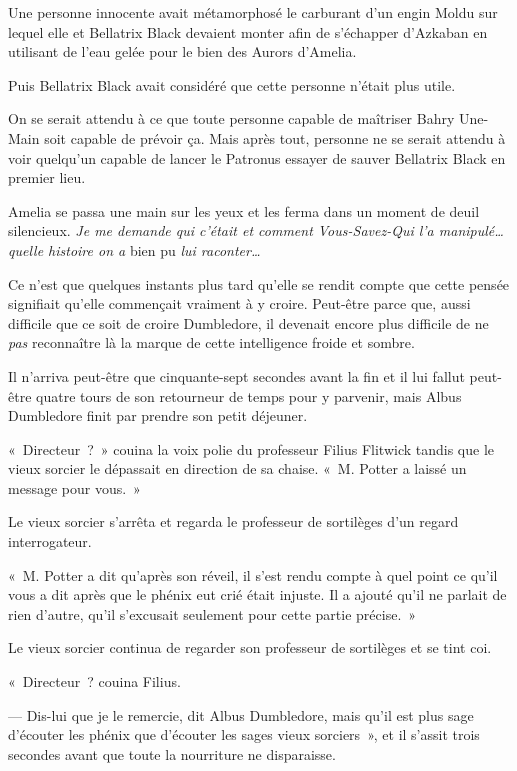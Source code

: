 Une personne innocente avait métamorphosé le carburant d'un engin Moldu sur lequel elle et Bellatrix Black devaient monter afin de s'échapper d'Azkaban en utilisant de l'eau gelée pour le bien des Aurors d'Amelia.

Puis Bellatrix Black avait considéré que cette personne n'était plus utile.

On se serait attendu à ce que toute personne capable de maîtriser Bahry Une-Main soit capable de prévoir ça.
Mais après tout, personne ne se serait attendu à voir quelqu'un capable de lancer le Patronus essayer de sauver Bellatrix Black en premier lieu.

Amelia se passa une main sur les yeux et les ferma dans un moment de deuil silencieux.
\emph{Je me demande qui c'était et comment Vous-Savez-Qui l'a manipulé… quelle histoire on a} bien pu \emph{lui raconter…}

Ce n'est que quelques instants plus tard qu'elle se rendit compte que cette pensée signifiait qu'elle commençait vraiment à y croire.
Peut-être parce que, aussi difficile que ce soit de croire Dumbledore, il devenait encore plus difficile de ne \emph{pas} reconnaître là la marque de cette intelligence froide et sombre.


Il n'arriva peut-être que cinquante-sept secondes avant la fin et il lui fallut peut-être quatre tours de son retourneur de temps pour y parvenir, mais Albus Dumbledore finit par prendre son petit déjeuner.

«~Directeur~?~»
couina la voix polie du professeur Filius Flitwick tandis que le vieux sorcier le dépassait en direction de sa chaise.
«~M. Potter a laissé un message pour vous.~»

Le vieux sorcier s'arrêta et regarda le professeur de sortilèges d'un regard interrogateur.

«~M. Potter a dit qu'après son réveil, il s'est rendu compte à quel point ce qu'il vous a dit après que le phénix eut crié était injuste.
Il a ajouté qu'il ne parlait de rien d'autre, qu'il s'excusait seulement pour cette partie précise.~»

Le vieux sorcier continua de regarder son professeur de sortilèges et se tint coi.

«~Directeur~? couina Filius.

--- Dis-lui que je le remercie, dit Albus Dumbledore, mais qu'il est plus sage d'écouter les phénix que d'écouter les sages vieux sorciers~», et il s'assit trois secondes avant que toute la nourriture ne disparaisse.

